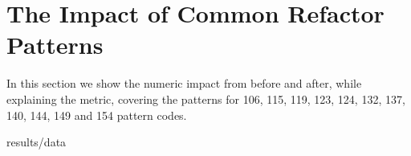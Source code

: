 \section{The Impact of Common Refactor Patterns}

In this section we show the numeric impact from before and after, while explaining the metric, covering the patterns for
106, 115, 119, 123, 124, 132, 137, 140, 144, 149 and 154 pattern codes.

{results/data}
